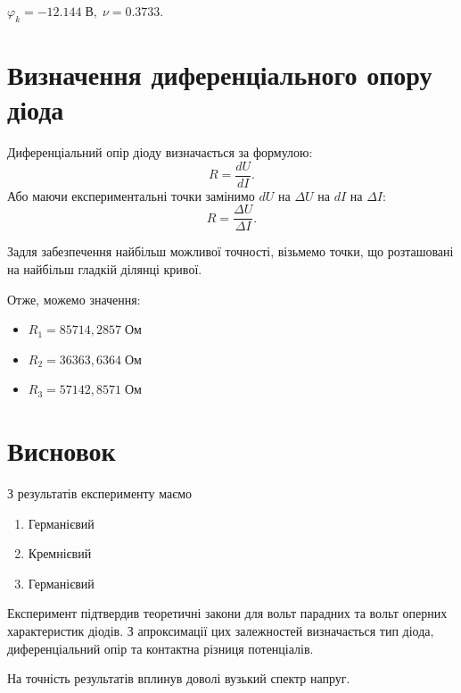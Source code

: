 \documentclass[12pt]{article}
\begin{document}
$\varphi_k = -12.144 \; \text{В}, \; \nu = 0.3733$.

\section{Визначення диференціального опору діода}
Диференціальний опір діоду визначається за формулою:
\[
    R = \dfrac{d U}{d I}.
\]
Або маючи експериментальні точки замінимо $dU$ на $\Delta U$ на $dI$ на $\Delta I$:
\[
	R = \dfrac{\Delta U}{\Delta I}.
\]

Задля забезпечення найбільш можливої точності, візьмемо точки, що розташовані на найбільш гладкій ділянці кривої.

Отже, можемо значення:

\begin{itemize}
    \item $R_1 = 85714,2857 \; \text{Ом}$
    \item $R_2 = 36363,6364 \; \text{Ом}$
    \item $R_3 = 57142,8571 \; \text{Ом}$
\end{itemize}

\newpage
\section{Висновок}

З результатів експерименту маємо

\begin{enumerate}
    \item
        Германієвий
    \item
        Кремнієвий
    \item
        Германієвий
\end{enumerate}

Експеримент підтвердив теоретичні закони для вольт парадних та вольт оперних характеристик діодів.
З апроксимації цих залежностей визначається тип діода, диференціальний опір та контактна різниця
потенціалів.

На точність результатів вплинув доволі вузький спектр напруг.
\end{document}
